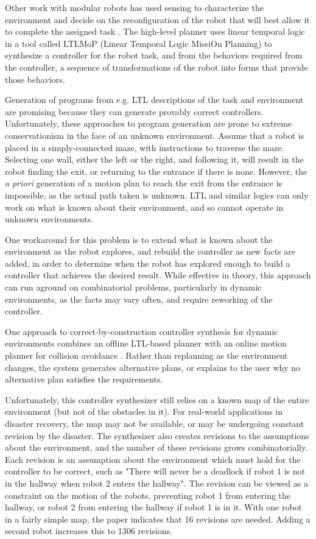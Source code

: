 Other work with modular robots has used sensing to characterize the environment and decide on the reconfiguration of the robot that will best allow it to complete the assigned task \cite{daudelin2017integrated, jing2016end}.
The high-level planner uses linear temporal logic in a tool called LTLMoP (Linear Temporal Logic MissiOn Planning) to synthesize a controller for the robot task, and from the behaviors required from the controller, a sequence of transformations of the robot into forms that provide those behaviors. 
	
Generation of programs from e.g. LTL descriptions of the task and environment are promising because they can generate provably correct controllers.
Unfortunately, these approaches to program generation are prone to extreme conservationism in the face of an unknown environment. 
Assume that a robot is placed in a simply-connected maze, with instructions to traverse the maze. 
Selecting one wall, either the left or the right, and following it, will result in the robot finding the exit, or returning to the entrance if there is none. 
However, the \emph{a priori} generation of a motion plan to reach the exit from the entrance is impossible, as the actual path taken is unknown. 
LTL and similar logics can only work on what is known about their environment, and so cannot operate in unknown environments. 
	
One workaround for this problem is to extend what is known about the environment as the robot explores, and rebuild the controller as new facts are added, in order to determine when the robot has explored enough to build a controller that achieves the desired result. 
While effective in theory, this approach can run aground on combinatorial problems, particularly in dynamic environments, as the facts may vary often, and require reworking of the controller. 

One approach to correct-by-construction controller synthesis for dynamic environments combines an offline LTL-based planner with an online motion planner for collision avoidance \citep{alonso2018reactive}. 
Rather than replanning as the environment changes, the system generates alternative plans, or explains to the user why no alternative plan satisfies the requirements.  

Unfortunately, this controller synthesizer still relies on a known map of the entire environment (but not of the obstacles in it). 
For real-world applications in disaster recovery, the map may not be available, or may be undergoing constant revision by the disaster. 
The synthesizer also creates revisions to the assumptions about the environment, and the number of these revisions grows combinatorially. 
Each revision is an assumption about the environment which must hold for the controller to be correct, such as "There will never be a deadlock if robot 1 is not in the hallway when robot 2 enters the hallway".
The revision can be viewed as a constraint on the motion of the robots, preventing robot 1 from entering the hallway, or robot 2 from entering the hallway if robot 1 is in it. 
With one robot in a fairly simple map, the paper indicates that 16 revisions are needed. 
Adding a second robot increases this to 1306 revisions.  

